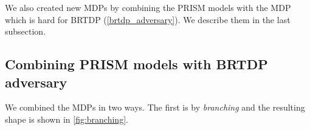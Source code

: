 We also created new MDPs by combining the PRISM models with the MDP
which is hard for BRTDP (\autoref{brtdp_adversary}). We describe them in
the last subsection.




\subsection*{Combining PRISM models with BRTDP adversary}

We combined the MDPs in two ways. The first is by {\em branching} and the
resulting shape is shown in \autoref{fig:branching}.

